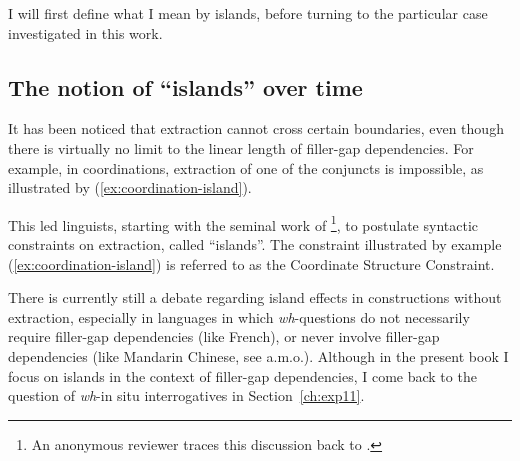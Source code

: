 I will first define what I mean by islands, before turning to the particular case investigated in this work.

\subsection{The notion of ``islands'' over time}

It has been noticed that extraction cannot cross certain boundaries, even though there is virtually no limit to the linear length of filler-gap dependencies. For example, in coordinations, extraction of one of the conjuncts is impossible, as illustrated by (\ref{ex:coordination-island}).

\eal \label{ex:coordination-island}
\zl

This led linguists, starting with the seminal work of \citet{Ross.1967}\footnote{An anonymous reviewer traces this discussion back to \citet{Chomsky.1964}.}, to postulate syntactic constraints on extraction, called ``islands''. The constraint illustrated by example (\ref{ex:coordination-island}) is referred to as the Coordinate Structure Constraint.

There is currently still a debate regarding island effects in constructions without extraction, especially in languages in which \textit{wh}-questions do not necessarily require filler-gap dependencies (like French), or never involve filler-gap dependencies (like Mandarin Chinese, see \citealt{Huang.1982,Aoun.1993,Lu.2020} a.m.o.). Although in the present book I focus on islands in the context of filler-gap dependencies, I come back to the question of \textit{wh}-in situ interrogatives in Section~\ref{ch:exp11}.

